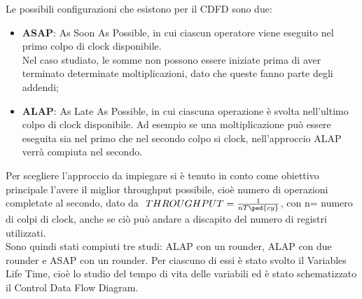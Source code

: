 \documentclass[a4paper, titlepage]{article}
\begin{document}
Le possibili configurazioni che esistono per il CDFD sono due:
\begin{itemize}
    \item \textbf{ASAP}: As Soon As Possible, in cui ciascun operatore viene eseguito nel primo colpo di clock disponibile.\\Nel caso studiato, le somme non possono essere iniziate prima di aver terminato determinate moltiplicazioni, dato che queste fanno parte degli addendi;
    \item \textbf{ALAP}: As Late As Possible, in cui ciascuna operazione è svolta nell'ultimo colpo di clock disponibile. Ad esempio se una moltiplicazione può essere eseguita sia nel primo che nel secondo colpo si clock, nell'approccio ALAP verrà compiuta nel secondo.
\end{itemize}
Per scegliere l'approccio da impiegare si è tenuto in conto come obiettivo principale l'avere il miglior throughput possibile, cioè numero di operazioni completate al secondo, dato da $\ THROUGHPUT=\frac{1}{n T\ped{cy}} $, con n= numero di colpi di clock, anche se ciò può andare a discapito del numero di registri utilizzati.\\Sono quindi stati compiuti tre studi: ALAP con un rounder, ALAP con due rounder e ASAP con un rounder. Per ciascuno di essi è stato svolto il Variables Life Time, cioè lo studio del tempo di vita delle variabili ed è stato schematizzato il Control Data Flow Diagram.
\end{document}
